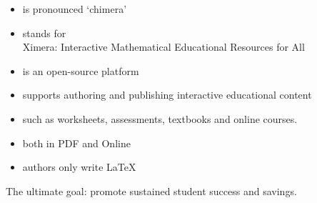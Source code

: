 \begin{frame}[t]{\Large{}}

  \begin{itemize}
  \item is pronounced \lq chimera\rq
  \item stands for \\
     {\Large\blue X}imera: {\Large\blue I}nteractive {\Large\blue M}athematical {\Large\blue E}ducational {\Large\blue R}esources for {\Large\blue A}ll
  \item is an open-source platform 
  \item supports authoring and publishing interactive educational content
  \item such as worksheets, assessments, textbooks and online courses. 
  \item both in PDF and Online
  \item authors only write \LaTeX %
  \end{itemize}
   
  \vfill

  The ultimate goal: promote sustained student success and savings.
  
  

\end{frame}

